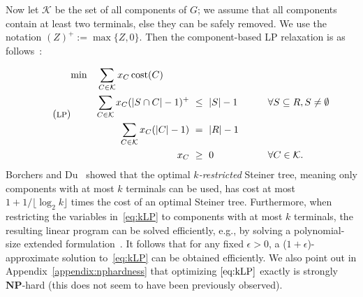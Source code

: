 \documentclass[11pt, letterpaper]{article}
\theoremstyle{definition}
\DeclareMathOperator{\cost}{cost}
\newcommand{\comp}{\mathcal{K}}
\newcommand{\card}[1]{\lvert#1\rvert}
\begin{document}
Now let $\comp$ be the set of all components of $G$; we assume that all components contain at least two terminals, else they can be safely removed.
We use the notation $(Z)^+ := \max\{Z, 0\}$.
Then the component-based LP relaxation is as follows~\cite{warme_1998_hyperspanningtrees}:
\begin{comment}
\begin{equation*}
\setlength{\extrarowheight}{0.4em}
\fbox{
\begin{minipage}{0.6\linewidth}
$$\begin{array}{c>{\displaystyle}rcll}
\min & \multicolumn{1}{l}{\displaystyle\sum_{C\in \comp}
         x_C\cost(C)} &&&\\
     & \sum_{C\in \comp}
	 x_C (\card{S\cap C}-1)^+ & \leq & \card{S}-1 & \forall S\subseteq R,
         S\neq \emptyset \\
     & \sum_{C\in \comp}
	 x_C (\card{C}-1) & = & \card{R}-1 & \\
     & x_C &\geq &0  &\forall C\in \comp
\end{array}$$
\end{minipage}
}\tag{\textsc{lp}}\label{eq:kLP}
\setlength{\extrarowheight}{0em}
\end{equation*}
\end{comment}
\begin{equation}\tag{\textsc{lp}}\label{eq:kLP}
	\begin{alignedat}{3}
\min \quad&&\sum_{C\in \comp}
         x_C\cost(C)\quad\quad\quad &\\
&&     \sum_{C\in \comp}
         x_C (|S\cap C|-1)^+  ~&\leq~  |S|-1 &\quad\qquad&\forall S\subseteq R,
         S\neq \emptyset \\
&&     \sum_{C\in \comp}
         x_C (|C|-1) ~& =~  |R|-1 \\
&&      x_C ~&\geq~ 0  &&\forall C\in \comp.
\end{alignedat}
\end{equation}
Borchers and Du~\cite{borchers_1997_ksteiner} showed that the optimal \emph{$k$-restricted} Steiner tree, meaning only components with at most $k$ terminals can be used, has cost at most $1+1/\lfloor\log_2 k\rfloor$ times the cost of an optimal Steiner tree. 
Furthermore, when restricting the variables in~\eqref{eq:kLP}
to components with at most $k$ terminals, the resulting
linear program can be solved efficiently, e.g., by solving
a polynomial-size extended formulation~\cite{byrka_2011_steiner}.  
It follows that for any fixed $\epsilon>0$, a ($1+\epsilon$)-approximate
solution to~\eqref{eq:kLP} can be obtained efficiently.
We also point out in Appendix~\ref{appendix:nphardness} that
optimizing $\eqref{eq:kLP}$ exactly is strongly $\mathbf{NP}$-hard (this does not
seem to have been previously observed).
\end{document}
